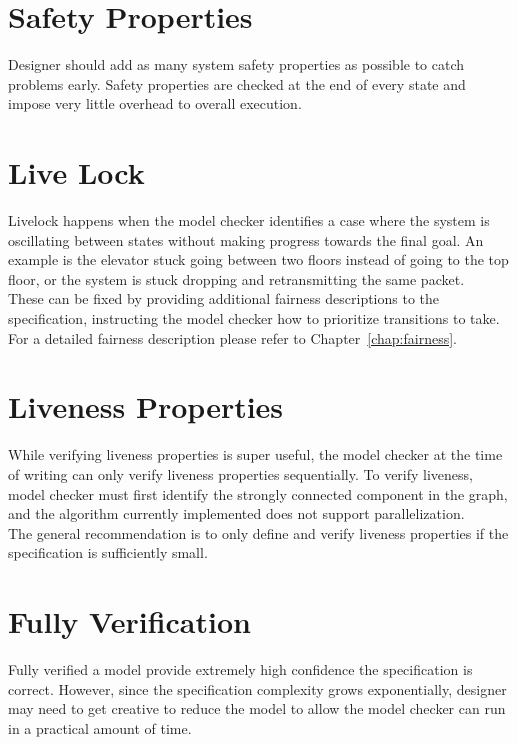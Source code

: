 \section{Safety Properties}

Designer should add as many system safety properties as possible to catch
problems early. Safety properties are checked at the end of every state and
impose very little overhead to overall execution.

\section{Live Lock}

Livelock happens when the model checker identifies a case where the system is 
oscillating between states without making progress towards the final goal.  An
example is the elevator stuck going between two floors instead of going to the
top floor, or the system is stuck dropping and retransmitting the same packet.\\

These can be fixed by providing additional fairness descriptions to the
specification, instructing the model checker how to prioritize transitions to
take.\\

For a detailed fairness description please refer to Chapter~\ref{chap:fairness}.

\section{Liveness Properties}

While verifying liveness properties is super useful, the model checker at the 
time of writing can only verify liveness properties sequentially. To verify
liveness, model checker must first identify the strongly connected component in
the graph, and the algorithm currently implemented does not support
parallelization.\\

The general recommendation is to only define and verify liveness properties if
the specification is sufficiently small. 

\section{Fully Verification}

Fully verified a model provide extremely high confidence the specification is
correct. However, since the specification complexity grows exponentially,
designer may need to get creative to reduce the model to allow the model checker can
run in a practical amount of time.\\

